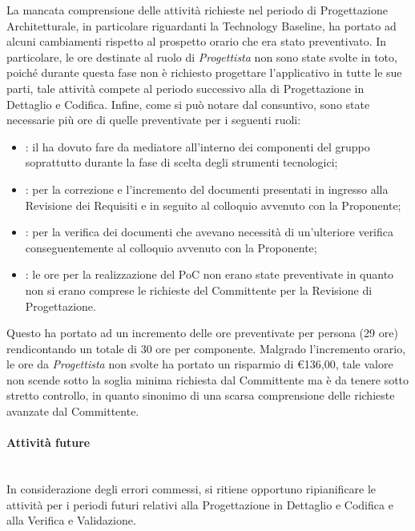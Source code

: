 La mancata comprensione delle attività richieste nel periodo di Progettazione Architetturale, in particolare riguardanti la Technology Baseline, ha portato ad alcuni cambiamenti rispetto al prospetto orario che era stato preventivato. In particolare, le ore destinate al ruolo di \textit{Progettista} non sono state svolte in toto, poiché durante questa fase non è richiesto progettare l'applicativo in tutte le sue parti, tale attività compete al periodo successivo alla di Progettazione in Dettaglio e Codifica. Infine, come si può notare dal consuntivo, sono state necessarie più ore di quelle preventivate per i seguenti ruoli:
\begin{itemize}
	\item \RdP{}: il \Res{} ha dovuto fare da mediatore all'interno dei componenti del gruppo soprattutto durante la fase di scelta degli strumenti tecnologici;
	\item \ana{}: per la correzione e l'incremento del documenti presentati in ingresso alla Revisione dei Requisiti e in seguito al colloquio avvenuto con la Proponente;
	\item \ver{}: per la verifica dei documenti che avevano necessità di un'ulteriore verifica conseguentemente al colloquio avvenuto con la Proponente;
	\item \progr{}: le ore per la realizzazione del PoC non erano state preventivate  in quanto non si erano comprese le richieste del Committente per la Revisione di Progettazione. 
\end{itemize} 
Questo ha portato ad un incremento delle ore preventivate per persona (29 ore) rendicontando un totale di 30 ore per componente.
Malgrado l'incremento orario, le ore da \textit{Progettista} non svolte ha portato un risparmio di \euro 136,00, tale valore non scende sotto la soglia minima richiesta dal Committente ma è da tenere sotto stretto controllo, in quanto sinonimo di una scarsa comprensione delle richieste avanzate dal Committente.

\paragraph{Attività future}\mbox{}\\
In considerazione degli errori commessi, si ritiene opportuno ripianificare le attività per i periodi futuri 
relativi alla Progettazione in Dettaglio e Codifica e alla Verifica e Validazione. 


